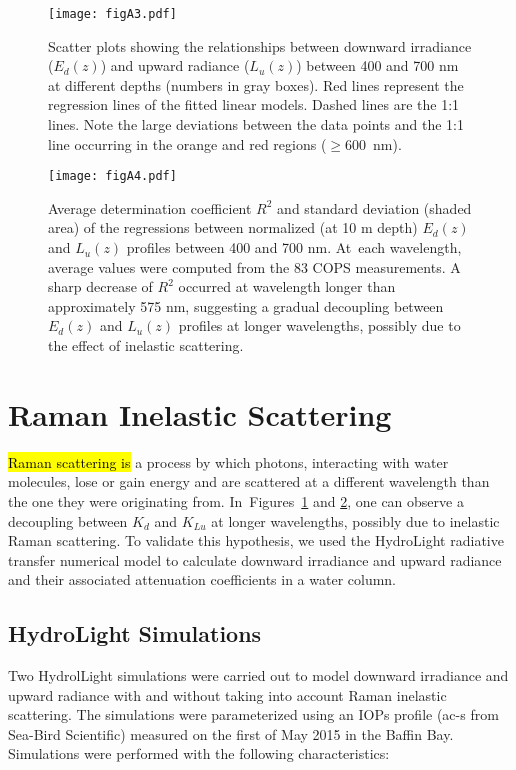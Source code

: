 \documentclass[applsci,article,accept,moreauthors,pdftex,10pt,a4paper]{Definitions/mdpi}
\newcommand{\ked}{\ensuremath{K_{d}}}
\newcommand{\klu}{\ensuremath{K_{Lu}}}
\newcommand{\edz}{\ensuremath{{E_d(z)}}}
\newcommand{\luz}{\ensuremath{{L_u(z)}}}
\begin{document}
\begin{figure}[H]
	\centering
	\texttt{[image: figA3.pdf]}
	\caption{Scatter plots showing the relationships between downward irradiance (\edz{}) and upward radiance (\luz{}) between 400 and 700 nm at different depths (numbers in gray boxes). Red lines represent the regression lines of the fitted linear models. Dashed lines are the 1:1 lines. Note the large deviations between the data points and the 1:1 line occurring in the orange and red regions ($\ge$600~nm).}\label{figA3}
\end{figure}
\unskip
\begin{figure}[H]
	\centering
	\texttt{[image: figA4.pdf]}
	\caption{Average determination coefficient \(R^2\) and standard deviation (shaded area) of the regressions between normalized (at 10 m depth) \edz{} and \luz{} profiles between 400 and 700 nm. At~each wavelength, average values were computed from the 83 COPS measurements. A sharp decrease of \(R^2\) occurred at wavelength longer than approximately 575 nm, suggesting a gradual decoupling between \edz{} and \luz{} profiles at longer wavelengths, possibly due to the effect of inelastic scattering.}\label{figA4}
\end{figure}


\section{Raman Inelastic Scattering}

\hl{Raman scattering is} %
a process by which photons, interacting with water molecules, lose or gain energy and are scattered at a different wavelength than the one they were originating from. In~Figures~\ref{figA3} and   \ref{figA4}, one can observe a decoupling between \ked{} and \klu{} at longer wavelengths, possibly due to inelastic Raman scattering. To validate this hypothesis, we used the HydroLight radiative transfer numerical model to calculate downward irradiance and upward radiance and their associated attenuation coefficients in a water column.

\subsection*{HydroLight Simulations}

Two HydrolLight simulations were carried out to model downward irradiance and upward radiance with and without taking into account Raman inelastic scattering. The simulations were parameterized using an IOPs profile (ac-s from Sea-Bird Scientific) measured on the first of May 2015 in the Baffin Bay. Simulations were performed with the following characteristics:
\end{document}

